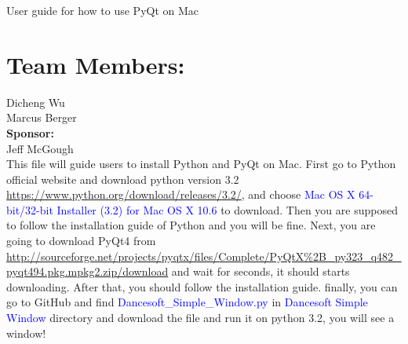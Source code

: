 \documentclass[11pt]{book}
\begin{document}
\fontsize{16}{16}\selectfont User guide for how to use PyQt on Mac

\section{Team Members:}
Dicheng Wu
\\Marcus Berger\\
\textbf{Sponsor:}
\\Jeff McGough
\\
This file will guide users to install Python and PyQt on Mac. First go to Python official website and download python version 3.2 \url{https://www.python.org/download/releases/3.2/}, and choose \textcolor{blue} {Mac OS X 64-bit/32-bit Installer (3.2) for Mac OS X 10.6 } to download. Then you are supposed to follow the installation guide of Python and you will be fine. Next, you are going to download PyQt4 from \url {http://sourceforge.net/projects/pyqtx/files/Complete/PyQtX%2B_py323_q482_pyqt494.pkg.mpkg2.zip/download} 
and wait for seconds, it should starts downloading. After that, you should follow the installation guide. finally, you can go to GitHub and find \textcolor{blue}{Dancesoft\_Simple\_Window.py} in \textcolor{blue} {Dancesoft Simple Window} directory and download the file and run it on python 3.2, you will see a window!
\end{document}

